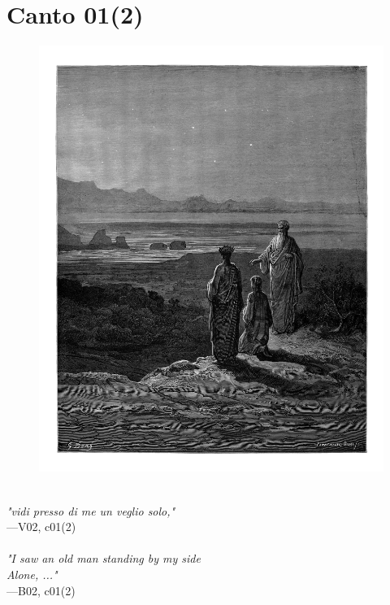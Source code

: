 \documentclass[../Dore_vision.tex]{subfiles}
\begin{document}
\newpage

\section{Canto 01(2)}

\begin{figure}[ht]
\centering
\includegraphics[height=\figsize]{illustrations/book_2/V02, c01(2).jpg}
\end{figure}

\begin{center}
\begin{minipage}{0.8\linewidth}
\textit{\\
"vidi presso di me un veglio solo,"} \\
—V02, c01(2) \\~\\
\textit{"I saw an old man standing by my side\\Alone, ..."} \\
—B02, c01(2)
\end{minipage}
\end{center}
\end{document}
